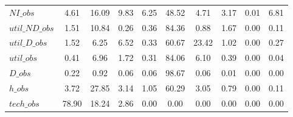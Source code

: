 \begin{center}
\begin{longtable}{lccccccccc}
$NI\_obs        $	 & 	         4.61	 & 	        16.09	 & 	         9.83	 & 	         6.25	 & 	        48.52	 & 	         4.71	 & 	         3.17	 & 	         0.01	 & 	         6.81 \\ 
$util\_ND\_obs  $	 & 	         1.51	 & 	        10.84	 & 	         0.26	 & 	         0.36	 & 	        84.36	 & 	         0.88	 & 	         1.67	 & 	         0.00	 & 	         0.11 \\ 
$util\_D\_obs   $	 & 	         1.52	 & 	         6.25	 & 	         6.52	 & 	         0.33	 & 	        60.67	 & 	        23.42	 & 	         1.02	 & 	         0.00	 & 	         0.27 \\ 
$util\_obs      $	 & 	         0.41	 & 	         6.96	 & 	         1.72	 & 	         0.31	 & 	        84.06	 & 	         6.10	 & 	         0.39	 & 	         0.00	 & 	         0.04 \\ 
$D\_obs         $	 & 	         0.22	 & 	         0.92	 & 	         0.06	 & 	         0.06	 & 	        98.67	 & 	         0.06	 & 	         0.01	 & 	         0.00	 & 	         0.00 \\ 
$h\_obs         $	 & 	         3.72	 & 	        27.85	 & 	         3.14	 & 	         1.05	 & 	        60.29	 & 	         3.05	 & 	         0.79	 & 	         0.00	 & 	         0.11 \\ 
$tech\_obs      $	 & 	        78.90	 & 	        18.24	 & 	         2.86	 & 	         0.00	 & 	         0.00	 & 	         0.00	 & 	         0.00	 & 	         0.00	 & 	         0.00 \\ 
\end{longtable}
 \end{center}
